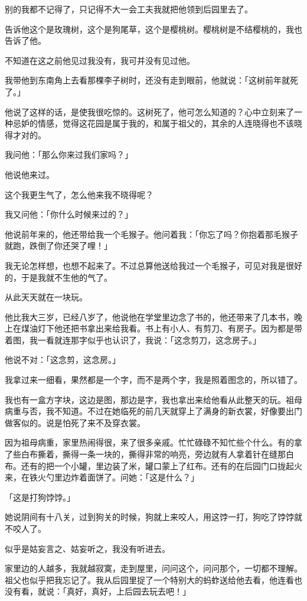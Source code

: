 \documentclass[UTF8]{ctexart}
\begin{document}
别的我都不记得了，只记得不大一会工夫我就把他领到后园里去了。

告诉他这个是玫瑰树，这个是狗尾草，这个是樱桃树。樱桃树是不结樱桃的，我也告诉了他。

不知道在这之前他见过我没有，我可并没有见过他。

我带他到东南角上去看那棵李子树时，还没有走到眼前，他就说：「这树前年就死了。」

他说了这样的话，是使我很吃惊的。这树死了，他可怎么知道的？心中立刻来了一种忌妒的情感，觉得这花园是属于我的，和属于祖父的，其余的人连晓得也不该晓得才对的。

我问他：「那么你来过我们家吗？」

他说他来过。

这个我更生气了，怎么他来我不晓得呢？

我又问他：「你什么时候来过的？」

他说前年来的，他还带给我一个毛猴子。他问着我：「你忘了吗？你抱着那毛猴子就跑，跌倒了你还哭了哩！」

我无论怎样想，也想不起来了。不过总算他送给我过一个毛猴子，可见对我是很好的，于是我就不生他的气了。

从此天天就在一块玩。

他比我大三岁，已经八岁了，他说他在学堂里边念了书的，他还带来了几本书，晚上在煤油灯下他还把书拿出来给我看。书上有小人、有剪刀、有房子。因为都是带着图，我一看就连那字似乎也认识了，我说：「这念剪刀，这念房子。」

他说不对：「这念剪，这念房。」

我拿过来一细看，果然都是一个字，而不是两个字，我是照着图念的，所以错了。

我也有一盒方字块，这边是图，那边是字，我也拿出来给他看从此整天的玩。祖母病重与否，我不知道。不过在她临死的前几天就穿上了满身的新衣裳，好像要出门做客似的。说是怕死了来不及穿衣裳。

因为祖母病重，家里热闹得很，来了很多亲戚。忙忙碌碌不知忙些个什么。有的拿了些白布撕着，撕得一条一块的，撕得非常的响亮，旁边就有人拿着针在缝那白布。还有的把一个小罐，里边装了米，罐口蒙上了红布。还有的在后园门口拢起火来，在铁火勺里边炸着面饼了。问她：「这是什么？」

「这是打狗饽饽。」

她说阴间有十八关，过到狗关的时候，狗就上来咬人，用这饽一打，狗吃了饽饽就不咬人了。

似乎是姑妄言之、姑妄听之，我没有听进去。

家里边的人越多，我就越寂寞，走到屋里，问问这个，问问那个，一切都不理解。祖父也似乎把我忘记了。我从后园里捉了一个特别大的蚂蚱送给他去看，他连看也没有看，就说：「真好，真好，上后园去玩去吧！」
\end{document}
